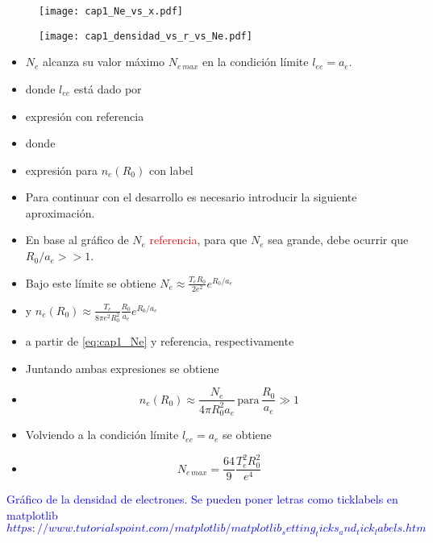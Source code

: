 \documentclass[aps,prb,twocolumn,superscriptaddress,floatfix,longbibliography,10pt]{revtex4-2}
\newif\ifptitle
\newif\ifpnumber
\newcounter{para}
\newcommand\ptitle[1]{\par\refstepcounter{para}
{\ifpnumber{\noindent\textcolor{lightgray}{\textbf{\thepara}}\indent}\fi}
{\ifptitle{\textbf{[{#1}]}}\fi}}
\begin{document}
\begin{figure}[h]
  \texttt{[image: cap1\_Ne\_vs\_x.pdf]}
  \caption{}
    \label{fig:cap1_Ne_vs_x}
\end{figure}

\begin{figure}[h]
  \texttt{[image: cap1\_densidad\_vs\_r\_vs\_Ne.pdf]}
  \caption{}
   \label{fig:cap1_densidad_vs_r_vs_Ne}
\end{figure}


\ptitle{Cálculo de $N_{e \, max}$}
\begin{itemize}
  \item $N_e$ alcanza su valor máximo $N_{e \, max}$ en la condición límite $l_{ee} = a_e$.
  \item donde $l_{ee}$ está dado por
  \item expresión con referencia
  \item donde
  \item expresión para $n_e(R_0)$ con label
  \item Para continuar con el desarrollo es necesario introducir la siguiente aproximación.
  \item En base al gráfico de $N_e$ \textcolor{red}{referencia}, para que $N_e$ sea grande, debe ocurrir que $R_0/a_e>>1$.
  \item Bajo este límite se obtiene $N_e \approx \frac{T_e R_0}{2 e^2} e^{R_0/a_e}$
  \item y $n_e(R_0) \approx \frac{T_e}{8 \pi e^2 R_0^2} \frac{R_0}{a_e} e^{R_0/a_e}$
  \item a partir de \ref{eq:cap1_Ne} y referencia, respectivamente
  \item Juntando ambas expresiones se obtiene
  \item \[n_e(R_0) \approx \frac{N_e}{4 \pi R_0^2 a_e} \, \mathrm{para } \, \frac{R_0}{a_e} \gg 1 \]
  \item Volviendo a la condición límite $l_{ee} = a_e$ se obtiene
  \item 
  \begin{equation}
    N_{e \, max} = \frac{64}{9} \frac{T_e^2 R_0^2}{e^4}
    \label{eq:cap1_Nemax_R0}
  \end{equation}
\end{itemize}

\textcolor{blue}{Gráfico de la densidad de electrones. Se pueden poner letras como ticklabels en matplotlib $https://www.tutorialspoint.com/matplotlib/matplotlib_setting_ticks_and_tick_labels.htm$}
\end{document}
